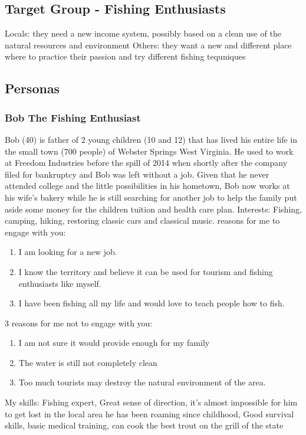\subsection{Target Group - Fishing Enthusiasts}
Locals: they need a new income system, possibly based on a clean use of the natural resources and environment
Others: they want a new and different place where to practice their passion and try different fishing tequniques
\subsection{Personas}
\subsubsection*{Bob The Fishing Enthusiast}

Bob (40) is father of 2 young children (10 and 12) that has lived his entire life in the small town (700 people) of Webster Springs West Virginia. He used to work at Freedom Industries before the spill of 2014 when shortly after the company filed for bankruptcy and Bob was left without a job. Given that he never attended college and the little possibilities in his hometown, Bob now works at his wife's bakery while he is still searching for another job to help the family put aside some money for the children tuition and health care plan.\newline
Interests: Fishing, camping, hiking, restoring classic cars and classical music.  reasons for me to engage with you:
\begin{enumerate} 
\item I am looking for a new job. 
\item I know the territory and believe it can be used for tourism and fishing enthusiasts like myself. 
\item I have been fishing all my life and would love to teach people how to fish. 
\end{enumerate}
3 reasons for me not to engage with you:
\begin{enumerate}
\item I am not sure it would provide enough for my family 
\item The water is still not completely clean 
\item Too much tourists may destroy the natural environment of the area. 
\end{enumerate}
My skills: \newline
Fishing expert, Great sense of direction, it's almost impossible for him to get lost in the local area he has been roaming since childhood, Good survival skills, basic medical training, can cook the best trout on the grill of the state \newline
